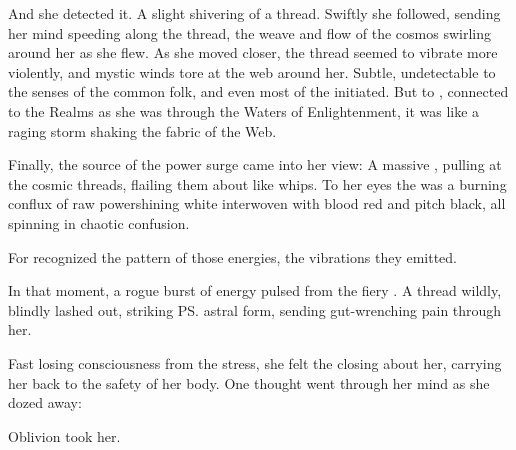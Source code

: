 And she detected it. A slight shivering of a thread. 
Swiftly she followed, sending her mind speeding along the thread, the weave and flow of the cosmos swirling around her as she flew. 
As she moved closer, the thread seemed to vibrate more violently, and mystic winds tore at the web around her. Subtle, undetectable to the senses of the common folk, and even most of the initiated. But to \Esmerel, connected to the Realms as she was through the Waters of Enlightenment, it was like a raging storm shaking the fabric of the Web. 

Finally, the source of the power surge came into her view: A massive \vertex{}, pulling at the cosmic threads, flailing them about like whips. To her eyes the \vertex{} was a burning conflux of raw power\dash shining white interwoven with blood red and pitch black, all spinning in chaotic confusion. 

 For \Esmerel{} recognized the pattern of those energies, the vibrations they emitted. 


In that moment, a rogue burst of energy pulsed from the fiery \vertex. A thread wildly, blindly lashed out, striking \ps{\Esmerel} astral form, sending gut-wrenching pain through her.

Fast losing consciousness from the stress, she felt the \sephiroth{} closing about her, carrying her back to the safety of her body. One thought went through her mind as she dozed away: 


Oblivion took her. 



